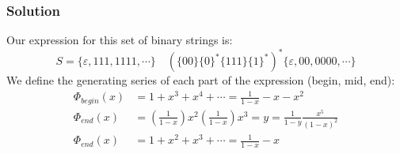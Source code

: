\documentclass{report}
\begin{document}
\begin{enumerate}
\begin{enumerate}
\subsubsection{Solution}
Our expression for this set of binary strings is:
$$S = \{\varepsilon, 111, 1111, \cdots\} \quad {(\{00\}\{0\}^*\{111\}\{1\}^*)}^*\{\varepsilon, 00, 0000, \cdots\}$$
We define the generating series of each part of the expression (begin, mid, end):
\begin{align*}
\Phi_{begin}(x) &= 1 + x^3 + x^4 + \cdots = \frac{1}{1-x}-x-x^2\\
\Phi_{end}(x) &= \left(\frac{1}{1-x}\right)x^2\left(\frac{1}{1-x}\right)x^3 = y = \frac{1}{1-y}\frac{x^5}{(1-x)^2} \\
\Phi_{end}(x) &= 1 + x^2 + x^3 + \cdots  = \frac{1}{1-x}-x\\
\end{align*}
\end{enumerate} 
\end{enumerate}
\end{document}
